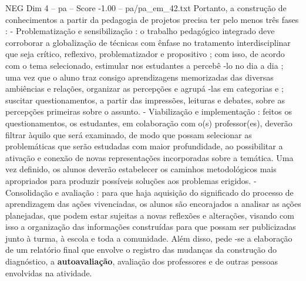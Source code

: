 \begin{textsample}{NEG Dim 4 – pa – Score -1.00 – pa/pa\_em\_42.txt}
Portanto, a construção de conhecimentos a partir da pedagogia de projetos precisa ter pelo menos três fases : - Problematização e sensibilização : o trabalho pedagógico integrado deve corroborar a globalização de técnicas com ênfase no tratamento interdisciplinar que seja crítico, reflexivo, problematizador e propositivo ; com isso, de acordo com o tema selecionado, estimular nos estudantes a percebê -lo no dia a dia ; uma vez que o aluno traz consigo aprendizagens memorizadas das diversas ambiências e relações, organizar as percepções e agrupá -las em categorias e ; suscitar questionamentos, a partir das impressões, leituras e debates, sobre as percepções primeiras sobre o assunto. - Viabilização e implementação : feitos os questionamentos, os estudantes, em colaboração com o(s) professor(es), deverão filtrar àquilo que será examinado, de modo que possam selecionar as problemáticas que serão estudadas com maior profundidade, ao possibilitar a ativação e conexão de novas representações incorporadas sobre a temática.
Uma vez definido, os alunos deverão estabelecer os caminhos metodológicos mais apropriados para produzir possíveis soluções aos problemas erigidos. - Consolidação e avaliação : para que haja aquisição do significado do processo de aprendizagem das ações vivenciadas, os alunos são encorajados a analisar as ações planejadas, que podem estar sujeitas a novas reflexões e alterações, visando com isso a organização das informações construídas para que possam ser publicizadas junto à turma, à escola e toda a comunidade.
Além disso, pede -se a elaboração de um relatório final que envolve o registro das mudanças da construção do diagnóstico, a \textbf{autoavaliação}, avaliação dos professores e de outras pessoas envolvidas na atividade.

\end{textsample}
